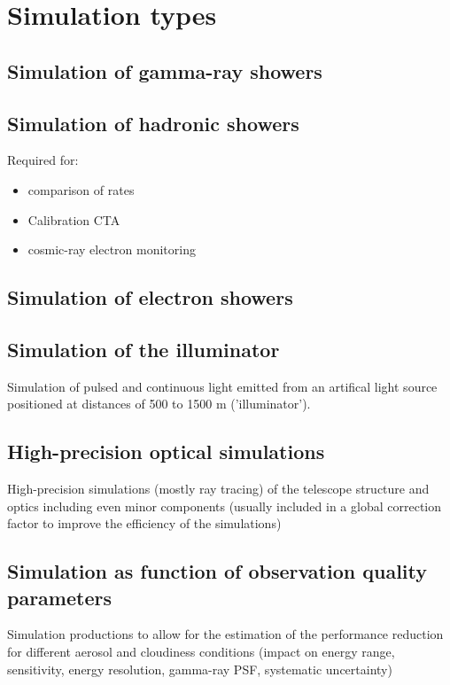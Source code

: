 \section{Simulation types}
\label{sect:SimulationTypes}

\subsection{Simulation of gamma-ray showers}

\subsection{Simulation of hadronic showers}

Required for:

\begin{itemize}
    \item comparison of rates
    \item Calibration CTA
    \item cosmic-ray electron monitoring
\end{itemize}

\subsection{Simulation of electron showers}

\subsection{Simulation of the illuminator}

Simulation of pulsed and continuous light emitted from an artifical light source positioned at distances of 500 to 1500 m ('illuminator').

\subsection{High-precision optical simulations}

High-precision simulations (mostly ray tracing) of the telescope structure and optics including even minor components (usually included in a global correction factor to improve the efficiency of the simulations)

\subsection{Simulation as function of observation quality parameters}

Simulation productions to allow for the estimation of the performance reduction for different aerosol and cloudiness conditions (impact on energy range, sensitivity, energy resolution, gamma-ray PSF, systematic uncertainty)

